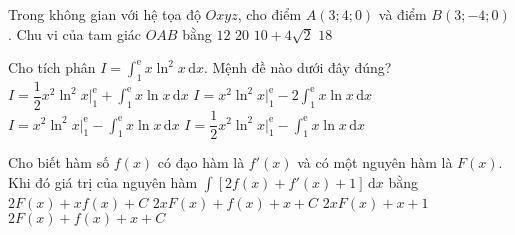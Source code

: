 \begin{ex}%
Trong không gian với hệ tọa độ $Oxyz$, cho điểm $A(3;4;0)$ và điểm $B(3;-4;0)$. Chu vi của tam giác $OAB$ bằng
\choice
{$12$}
{$20$}
{$10+4\sqrt{2}$}
{\True $18$}
\end{ex}

\begin{ex}%
Cho tích phân $I=\displaystyle\int_1^{\mathrm{e}} x\ln^2 x \mathrm{\,d}x$. Mệnh đề nào dưới đây đúng?
\choice
{$I=\dfrac{1}{2} x^2\ln^2 x\bigg|_1^{\mathrm{e}}+\displaystyle\int_1^{\mathrm{e}} x\ln x \mathrm{\,d}x$}
{$I=x^2\ln^2 x\bigg|_1^{\mathrm{e}}-2\displaystyle\int_1^{\mathrm{e}} x\ln x \mathrm{\,d}x$}
{$I=x^2\ln^2 x\bigg|_1^{\mathrm{e}}-\displaystyle\int_1^{\mathrm{e}} x\ln x \mathrm{\,d}x$}
{\True $I=\dfrac{1}{2} x^2\ln^2 x\bigg|_1^{\mathrm{e}}-\displaystyle\int_1^{\mathrm{e}} x\ln x \mathrm{\,d}x$}
\end{ex}

\begin{ex}%
Cho biết hàm số $f(x)$ có đạo hàm là $f'(x)$ và có một nguyên hàm là $F(x)$. Khi đó giá trị của nguyên hàm $\displaystyle\int\left[2 f(x)+f'(x)+1\right]\mathrm{\,d}x$ bằng
\choice
{$2 F(x)+x f(x)+C$}
{$2x F(x)+f(x)+x+C$}
{$2x F(x)+x+1$}
{\True $2 F(x)+f(x)+x+C$}
\end{ex}

